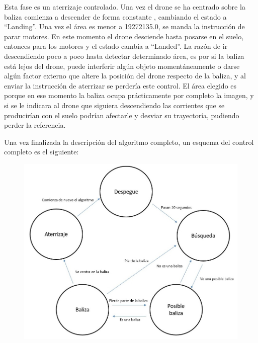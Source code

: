 \hspace{1 cm} Esta fase es un aterrizaje controlado. Una vez el drone se ha centrado sobre la baliza comienza a descender de forma constante , cambiando el estado a "`Landing"'. Una vez el \'area es menor a 19272135.0, se manda la instrucci\'on de parar motores. En este momento el drone desciende hasta posarse en el suelo, entonces para los motores y el estado cambia a "`Landed"'. La raz\'on de ir descendiendo poco a poco hasta detectar determinado \'area, es por si la baliza est\'a lejos del drone, puede interferir alg\'un objeto moment\'aneamente o darse alg\'un factor externo que altere la posici\'on del drone respecto de la baliza, y al enviar la instrucci\'on de aterrizar se perder\'ia este control. El \'area elegido es porque en ese momento la baliza ocupa pr\'acticamente por completo la imagen, y si se le indicara al drone que siguiera descendiendo las corrientes que se producir\'ian con el suelo podr\'ian afectarle y desviar su trayector\'ia, pudiendo perder la referencia.


\hspace{1 cm} Una vez finalizada la descripci\'on del algoritmo completo, un esquema del control completo es el siguiente:
\begin{figure}[ht]
	\centering
		\includegraphics[width=1\textwidth]{imgs/EsquemaAlgoritmo.jpg}
	\label{fig:Esquema_control}
\end{figure}


